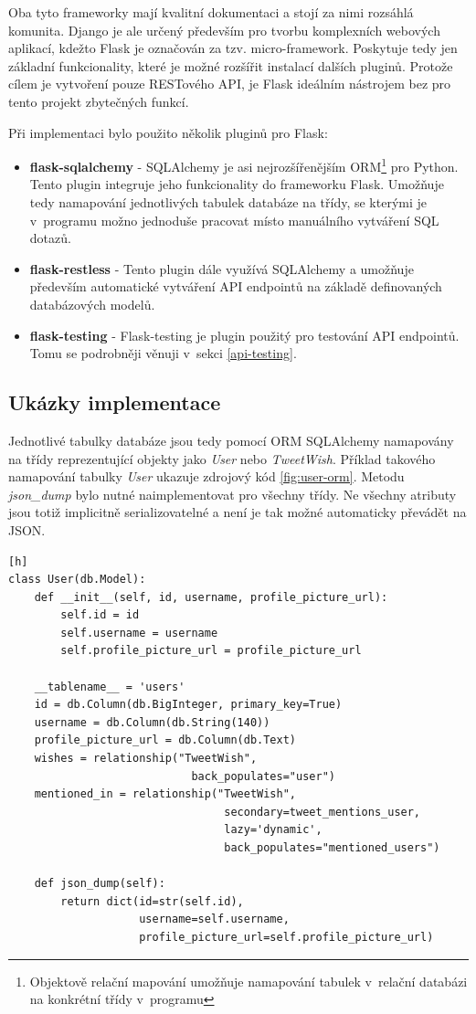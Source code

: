 \documentclass[thesis=B,czech]{FITthesis}[2012/06/26]
\begin{document}
	Oba tyto frameworky mají kvalitní dokumentaci a stojí za nimi rozsáhlá komunita. Django je ale určený především pro tvorbu komplexních webových aplikací, kdežto Flask je označován za tzv. micro-framework. Poskytuje tedy jen základní funkcionality, které je možné rozšířit instalací dalších pluginů. Protože cílem je vytvoření pouze RESTového API, je Flask ideálním nástrojem bez pro tento projekt zbytečných funkcí. 
	
\noindent Při implementaci bylo použito několik pluginů pro Flask:
	
\begin{itemize}
\item \textbf{flask-sqlalchemy} - SQLAlchemy je asi nejrozšířenějším ORM\footnote{Objektově relační mapování umožňuje namapování tabulek v~relační databázi na konkrétní třídy v~programu} pro Python. Tento plugin integruje jeho funkcionality do frameworku Flask. Umožňuje tedy namapování jednotlivých tabulek databáze na třídy, se kterými je v~programu možno jednoduše pracovat místo manuálního vytváření SQL dotazů. 
\item \textbf{flask-restless} - Tento plugin dále využívá SQLAlchemy a umožňuje především automatické vytváření API endpointů na základě definovaných databázových modelů. 
\item \textbf{flask-testing} - Flask-testing je plugin použitý pro testování API endpointů. Tomu se podrobněji věnuji v~sekci \ref{api-testing}.
\end{itemize}

\subsection{Ukázky implementace}
Jednotlivé tabulky databáze jsou tedy pomocí ORM SQLAlchemy namapovány na třídy reprezentující objekty jako \textit{User} nebo \textit{TweetWish}. Příklad takového namapování tabulky \textit{User} ukazuje zdrojový kód \ref{fig:user-orm}. Metodu \textit{json\_dump} bylo nutné naimplementovat pro všechny třídy. Ne všechny atributy jsou totiž implicitně serializovatelné a není je tak možné automaticky převádět na JSON. 

\begin{lstlisting}[caption={Ukázka použití ORM SQLAlchemy},label=fig:user-orm][h]
class User(db.Model):
	def __init__(self, id, username, profile_picture_url):
		self.id = id
		self.username = username
		self.profile_picture_url = profile_picture_url

	__tablename__ = 'users'
	id = db.Column(db.BigInteger, primary_key=True)
	username = db.Column(db.String(140))
	profile_picture_url = db.Column(db.Text)
	wishes = relationship("TweetWish",
							back_populates="user")
	mentioned_in = relationship("TweetWish",
    							 secondary=tweet_mentions_user,
								 lazy='dynamic',
								 back_populates="mentioned_users")

	def json_dump(self):
		return dict(id=str(self.id),
					username=self.username,
					profile_picture_url=self.profile_picture_url)
\end{lstlisting}
\end{document}
